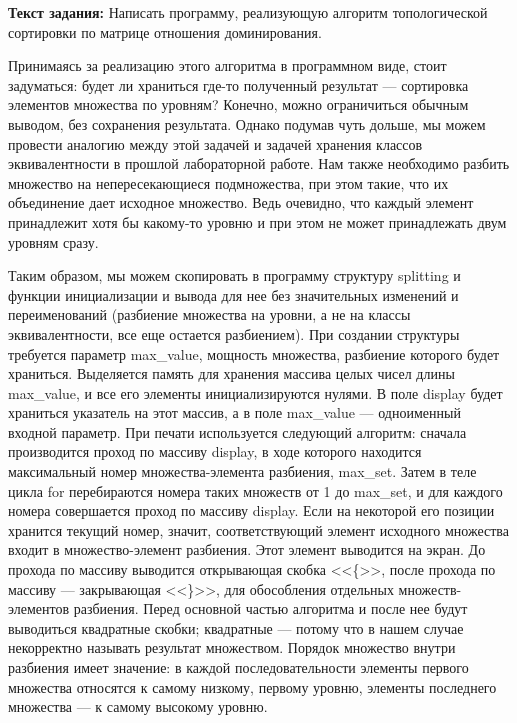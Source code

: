 \documentclass[12pt]{article}
\begin{document}
	{\bf Текст задания:} Написать программу, реализующую алгоритм топологической сортировки по матрице отношения доминирования.
	
	Принимаясь за реализацию этого алгоритма в программном виде, стоит задуматься: будет ли храниться где-то полученный результат --- сортировка элементов множества по уровням? Конечно, можно ограничиться обычным выводом, без сохранения результата. Однако подумав чуть дольше, мы можем провести аналогию между этой задачей и задачей хранения классов эквивалентности в прошлой лабораторной работе. Нам также необходимо разбить множество на непересекающиеся подмножества, при этом такие, что их объединение дает исходное множество. Ведь очевидно, что каждый элемент принадлежит хотя бы какому-то уровню и при этом не может принадлежать двум уровням сразу.
	
	Таким образом, мы можем скопировать в программу структуру splitting и функции инициализации и вывода для нее без значительных изменений и переименований (разбиение множества на уровни, а не на классы эквивалентности, все еще остается разбиением). При создании структуры требуется параметр max\_value, мощность множества, разбиение которого будет храниться. Выделяется память для хранения массива целых чисел длины max\_value, и все его элементы инициализируются нулями. В поле display будет храниться указатель на этот массив, а в поле max\_value --- одноименный входной параметр. При печати используется следующий алгоритм: сначала производится проход по массиву display, в ходе которого находится максимальный номер множества-элемента разбиения, max\_set. Затем в теле цикла for перебираются номера таких множеств от 1 до max\_set, и для каждого номера совершается проход по массиву display. Если на некоторой его позиции хранится текущий номер, значит, соответствующий элемент исходного множества входит в множество-элемент разбиения. Этот элемент выводится на экран. До прохода по массиву выводится открывающая скобка <<\{>>, после прохода по массиву --- закрывающая <<\}>>, для обособления отдельных множеств-элементов разбиения. Перед основной частью алгоритма и после нее будут выводиться квадратные скобки; квадратные --- потому что в нашем случае некорректно называть результат множеством. Порядок множество внутри разбиения имеет значение: в каждой последовательности элементы первого множества относятся к самому низкому, первому уровню, элементы последнего множества --- к самому высокому уровню.
	
\end{document}
